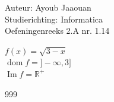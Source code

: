 \documentclass[a4paper]{article}
\begin{document}
  
\noindent \large Auteur: Ayoub Jaaouan          \\
\noindent \large Studierichting: Informatica   \\ 
\noindent \large Oefeningenreeks 2.A nr. 1.14   \\

\medskip

\normalsize



$f(x) = \sqrt{3-x}$\\

$\operatorname{dom}f = ]-\infty,3]$\\

$\operatorname{Im}f = \mathbb{R}^+$\\




\begin{thebibliography}{999}
\end{thebibliography}
\end{document}
